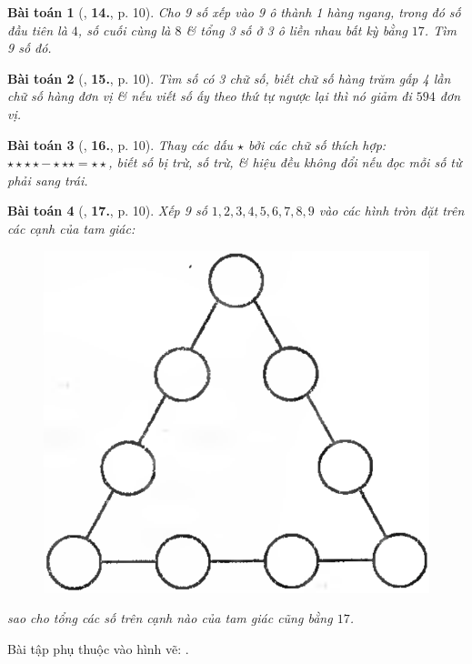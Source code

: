 \documentclass{article}
\numberwithin{equation}{section}
\newtheorem{baitoan}{Bài toán}
\begin{document}
\begin{baitoan}[\cite{Binh_Toan_6_tap_1}, \textbf{14.}, p. 10]
	Cho 9 số xếp vào 9 ô thành 1 hàng ngang, trong đó số đầu tiên là $4$, số cuối cùng là $8$ \& tổng 3 số ở 3 ô liền nhau bất kỳ bằng $17$. Tìm 9 số đó.
\end{baitoan}

\begin{baitoan}[\cite{Binh_Toan_6_tap_1}, \textbf{15.}, p. 10]
	Tìm số có 3 chữ số, biết chữ số hàng trăm gấp 4 lần chữ số hàng đơn vị \& nếu viết số ấy theo thứ tự ngược lại thì nó giảm đi $594$ đơn vị.
\end{baitoan}

\begin{baitoan}[\cite{Binh_Toan_6_tap_1}, \textbf{16.}, p. 10]
	Thay các dấu $\star$ bởi các chữ số thích hợp: $\star\star\star\star - \star\star\star = \star\star$, biết số bị trừ, số trừ, \& hiệu đều không đổi nếu đọc mỗi số từ phải sang trái.
\end{baitoan}

\begin{baitoan}[\cite{Binh_Toan_6_tap_1}, \textbf{17.}, p. 10]
	Xếp 9 số $1,2,3,4,5,6,7,8,9$ vào các hình tròn đặt trên các cạnh của tam giác:
	\begin{figure}[H]
		\centering
		\includegraphics[scale=0.1]{Binh_17_p_10}
	\end{figure}
	sao cho tổng các số trên cạnh nào của tam giác cũng bằng $17$.
\end{baitoan}
Bài tập phụ thuộc vào hình vẽ: \cite[\textbf{18.}, p. 10]{Binh_Toan_6_tap_1}.
\end{document}
